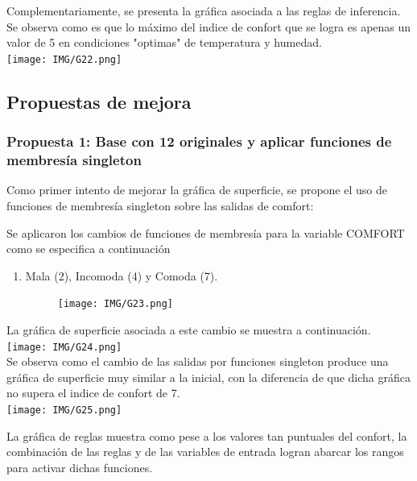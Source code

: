 \documentclass[11pt, letterpaper]{article}
\begin{document}
\newpage

Complementariamente, se presenta la gráfica asociada a las reglas de inferencia. Se observa como es que lo máximo del indice de confort que se logra es apenas un valor de 5 en condiciones "optimas" de temperatura y humedad.\\


\texttt{[image: IMG/G22.png]}




\newpage

\subsection{Propuestas de mejora}

\subsubsection{Propuesta 1: Base con 12 originales y aplicar funciones de membresía singleton}

Como primer intento de mejorar la gráfica de superficie, se propone el uso de funciones de membresía singleton sobre las salidas de comfort:

Se aplicaron los cambios de funciones de membresía para la variable COMFORT como se especifica a continuación

\begin{enumerate}
	\item Mala (2), Incomoda (4) y Comoda (7).
	\begin{figure}[h]
		\centering
		\texttt{[image: IMG/G23.png]}
	\end{figure}
\end{enumerate}


\newpage 

La gráfica de superficie asociada a este cambio se muestra a continuación. \\


\texttt{[image: IMG/G24.png]} \\

Se observa como el cambio de las salidas por funciones singleton produce una gráfica de superficie muy similar a la inicial, con la diferencia de que dicha gráfica no supera el indice de confort de 7. \\

\texttt{[image: IMG/G25.png]}

La gráfica de reglas muestra como pese a los valores tan puntuales del confort, la combinación de las reglas y de las variables de entrada logran abarcar los rangos para activar dichas funciones. \\
\end{document}
